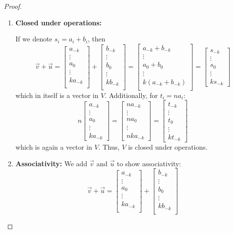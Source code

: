 \documentclass[11pt]{article}
\newcommand{\vect}[1]{\begin{bmatrix}#1\end{bmatrix}}
\begin{document}
\begin{enumerate}[label=\arabic*.]
\begin{proof}
        \begin{enumerate}
        
        \item \textbf{Closed under operations:} 
        
        If we denote $s_i=a_i+b_i$, then 
        $$\vec{v}+\vec{u} = \vect{a_{-k} \\ \vdots \\a_0 \\ \vdots \\ k a_{-k} \\} + \vect{b_{-k} \\ \vdots \\b_0 \\ \vdots \\ k b_{-k} \\} = \vect{a_{-k}+b_{-k} \\ \vdots \\a_0+b_0 \\ \vdots \\ k(a_{-k}+ b_{-k}) \\} = \vect{s_{-k} \\ \vdots \\s_0 \\ \vdots \\ ks_{-k} }$$
        which in itself is a vector in $V$. Additionally, for $t_i = na_{i}$: 
        \[n\vect{a_{-k} \\ \vdots \\a_0 \\ \vdots \\ k a_{-k} } = \vect{na_{-k} \\ \vdots \\na_0 \\ \vdots \\ nk a_{-k} }
        = \vect{t_{-k} \\ \vdots \\t_0 \\ \vdots \\ k t_{-k} }
        \]
        which is again a vector in $V$. Thus, $V$ is closed under operations.
        \item \textbf{Associativity:} We add $\vec{v}$ and $\vec{u}$ to show associativity:
        $$
        \vec{v}+\vec{u} = \vect{a_{-k} \\ \vdots \\a_0 \\ \vdots \\ k a_{-k} \\} + \vect{b_{-k} \\ \vdots \\b_0 \\ \vdots \\ k b_{-k} \\} 
$$
\end{enumerate}
\end{proof}
\end{enumerate}
\end{document}
